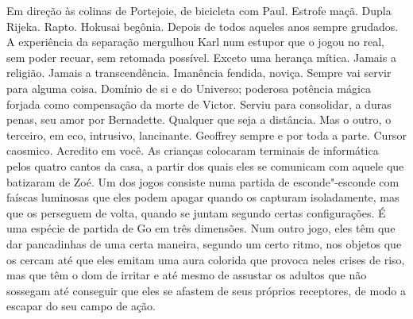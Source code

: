 Em direção às colinas de Portejoie, de bicicleta com Paul. Estrofe maçã.
Dupla Rijeka. Rapto. Hokusai begônia. Depois de todos aqueles anos
sempre grudados. A experiência da separação mergulhou Karl num estupor
que o jogou no real, sem poder recuar, sem retomada possível. Exceto uma
herança mítica. Jamais a religião. Jamais a transcendência. Imanência
fendida, noviça. Sempre vai servir para alguma coisa. Domínio de si e do
Universo; poderosa potência mágica forjada como compensação da morte de
Victor. Serviu para consolidar, a duras penas, seu amor por Bernadette.
Qualquer que seja a distância. Mas o outro, o terceiro, em eco,
intrusivo, lancinante. Geoffrey sempre e por toda a parte. Cursor
caosmico. Acredito em você. As crianças colocaram terminais de
informática pelos quatro cantos da casa, a partir dos quais eles se
comunicam com aquele que batizaram de Zoé. Um dos jogos consiste numa
partida de esconde"-esconde com faíscas luminosas que eles podem apagar
quando os capturam isoladamente, mas que os perseguem de volta, quando
se juntam segundo certas configurações. É uma espécie de partida de Go
em três dimensões. Num outro jogo, eles têm que dar pancadinhas de uma
certa maneira, segundo um certo ritmo, nos objetos que os cercam até que
eles emitam uma aura colorida que provoca neles crises de riso, mas que
têm o dom de irritar e até mesmo de assustar os adultos que não sossegam
até conseguir que eles se afastem de seus próprios receptores, de modo a
escapar do seu campo de ação.

